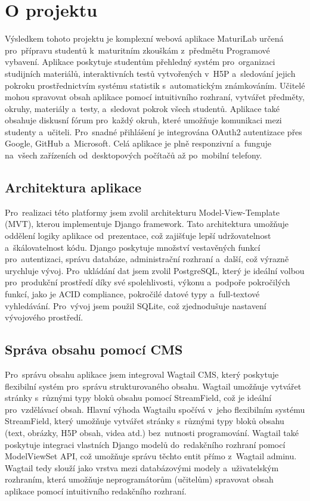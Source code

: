 \documentclass[12pt, a4paper,
twoside,
openany
]{report}
\begin{document}
	\section{O projektu}
	
	Výsledkem tohoto projektu je komplexní webová aplikace MaturiLab určená pro~přípravu studentů k~maturitním zkouškám z~předmětu Programové vybavení. Aplikace poskytuje studentům přehledný systém pro~organizaci studijních materiálů, interaktivních testů vytvořených v~H5P a~sledování jejich pokroku prostřednictvím systému statistik s~automatickým známkováním. Učitelé mohou spravovat obsah aplikace pomocí intuitivního rozhraní, vytvářet předměty, okruhy, materiály a~testy, a~sledovat pokrok všech studentů. Aplikace také obsahuje diskusní fórum pro~každý okruh, které umožňuje komunikaci mezi studenty a~učiteli. Pro~snadné přihlášení je integrována OAuth2 autentizace přes Google, GitHub a~Microsoft. Celá aplikace je plně responzivní a~funguje na~všech zařízeních od~desktopových počítačů až po~mobilní telefony.

	\subsection{Architektura aplikace}
	
	Pro~realizaci této platformy jsem zvolil architekturu Model-View-Template (MVT), kterou implementuje Django framework. Tato architektura umožňuje oddělení logiky aplikace od~prezentace, což zajišťuje lepší udržovatelnost a~škálovatelnost kódu. Django poskytuje množství vestavěných funkcí pro~autentizaci, správu databáze, administrační rozhraní a~další, což výrazně urychluje vývoj. Pro~ukládání dat jsem zvolil PostgreSQL, který je ideální volbou pro~produkční prostředí díky své spolehlivosti, výkonu a~podpoře pokročilých funkcí, jako je ACID compliance, pokročilé datové typy a~full-textové vyhledávání. Pro~vývoj jsem použil SQLite, což zjednodušuje nastavení vývojového prostředí.

	\subsection{Správa obsahu pomocí CMS}
	
	Pro~správu obsahu aplikace jsem integroval Wagtail CMS, který poskytuje flexibilní systém pro~správu strukturovaného obsahu. Wagtail umožňuje vytvářet stránky s~různými typy bloků obsahu pomocí StreamField, což je ideální pro~vzdělávací obsah. Hlavní výhoda Wagtailu spočívá v~jeho flexibilním systému StreamField, který umožňuje vytvářet stránky s~různými typy bloků obsahu (text, obrázky, H5P obsah, videa atd.) bez~nutnosti programování. Wagtail také poskytuje integraci vlastních Django modelů do~redakčního rozhraní pomocí ModelViewSet API, což umožňuje správu těchto entit přímo z~Wagtail adminu. Wagtail tedy slouží jako vrstva mezi databázovými modely a~uživatelským rozhraním, která umožňuje neprogramátorům (učitelům) spravovat obsah aplikace pomocí intuitivního redakčního rozhraní.
\end{document}
